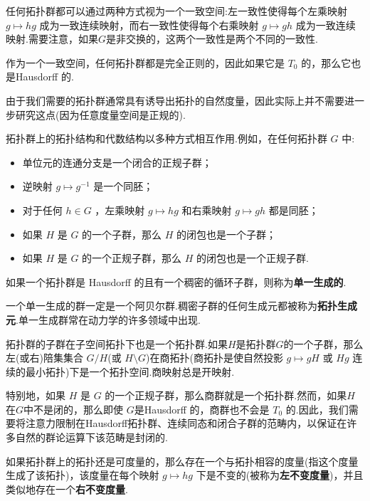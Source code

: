 \documentclass[lang=cn,a4paper,11pt,openany,scheme=chinese]{elegantbook}
\newcommand{\bluebf}[1]{\textcolor{structurecolor}{\textbf{#1}}}
\begin{document}
任何拓扑群都可以通过两种方式视为一个一致空间:左一致性使得每个左乘映射 \(g \mapsto  {hg}\) 成为一致连续映射，而右一致性使得每个右乘映射 \(g \mapsto  {gh}\) 成为一致连续映射.需要注意，如果$G$是非交换的，这两个一致性是两个不同的一致性.\par
作为一个一致空间，任何拓扑群都是完全正则的，因此如果它是 \({T}_{0}\) 的，那么它也是Hausdorff 的.\par
由于我们需要的拓扑群通常具有诱导出拓扑的自然度量，因此实际上并不需要进一步研究这点(因为任意度量空间是正规的).\par
拓扑群上的拓扑结构和代数结构以多种方式相互作用.例如，在任何拓扑群 \(G\) 中:

\begin{itemize}
\item 单位元的连通分支是一个闭合的正规子群；
\item 逆映射 \(g \mapsto  {g}^{-1}\) 是一个同胚；
\item 对于任何 \(h \in  G\) ，左乘映射 \(g \mapsto  {hg}\) 和右乘映射 \(g \mapsto  {gh}\) 都是同胚；
\item 如果 \(H\) 是 \(G\) 的一个子群，那么 \(H\) 的闭包也是一个子群；
\item 如果 \(H\) 是 \(G\) 的一个正规子群，那么 \(H\) 的闭包也是一个正规子群.
\end{itemize}
\begin{definition}[单一生成]
    如果一个拓扑群是 Hausdorff 的且有一个稠密的循环子群，则称为\textbf{单一生成的}.
\end{definition}\par
一个单一生成的群一定是一个阿贝尔群.稠密子群的任何生成元都被称为\bluebf{拓扑生成元}.单一生成群常在动力学的许多领域中出现.\par
拓扑群的子群在子空间拓扑下也是一个拓扑群.如果\(H\)是拓扑群\(G\)的一个子群，那么左(或右)陪集集合 \(G/H\)(或 \(H\setminus  G\))在商拓扑(商拓扑是使自然投影 \(g \mapsto  {gH}\) 或 \({Hg}\) 连续的最小拓扑)下是一个拓扑空间.商映射总是开映射.\par
特别地，如果 \(H\) 是 \(G\) 的一个正规子群，那么商群就是一个拓扑群.然而，如果\(H\)在\(G\)中不是闭的，那么即使 \(G\)是Hausdorff 的，商群也不会是 \({T}_{0}\) 的.因此，我们需要将注意力限制在Hausdorff拓扑群、连续同态和闭合子群的范畴内，以保证在许多自然的群论运算下该范畴是封闭的.\par
如果拓扑群上的拓扑还是可度量的，那么存在一个与拓扑相容的度量(指这个度量生成了该拓扑)，该度量在每个映射 \(g \mapsto  {hg}\) 下是不变的(被称为\bluebf{左不变度量})，并且类似地存在一个\bluebf{右不变度量}.\par
\end{document}
